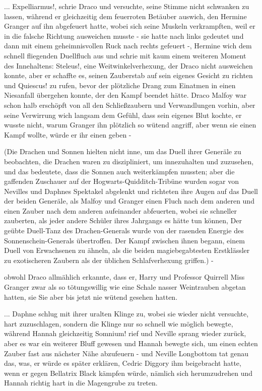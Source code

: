 ... \glqq{}Expelliarmus!\grqq{}, schrie Draco und versuchte, seine Stimme nicht
schwanken zu lassen, während er gleichzeitig dem feuerroten Betäuber auswich,
den Hermine Granger auf ihn abgefeuert hatte, wobei sich seine Muskeln
verkrampften, weil er in die falsche Richtung ausweichen musste - sie hatte nach
links gedeutet und dann mit einem geheimnisvollen Ruck nach rechts gefeuert -,
Hermine wich dem schnell fliegenden Duellfluch aus und schrie mit kaum einem
weiteren Moment des Innehaltens: \glqq{}Steleus!\grqq{}, eine
Weitwinkelverhexung, der Draco nicht ausweichen konnte, aber er schaffte es,
seinen Zauberstab auf sein eigenes Gesicht zu richten und \glqq{}Quiescus!\grqq{}
zu rufen, bevor der plötzliche Drang zum Einatmen in einen Niesanfall übergehen
konnte, der den Kampf beendet hätte. Draco Malfoy war schon halb erschöpft von
all den Schließzaubern und Verwandlungen vorhin, aber seine Verwirrung wich
langsam dem Gefühl, dass sein eigenes Blut kochte, er wusste nicht, warum
Granger ihn plötzlich so wütend angriff, aber wenn sie einen Kampf wollte, würde
er ihr einen geben -

(Die Drachen und Sonnen hielten nicht inne, um das Duell ihrer Generäle zu
beobachten, die Drachen waren zu diszipliniert, um innezuhalten und zuzusehen,
und das bedeutete, dass die Sonnen auch weiterkämpfen mussten; aber die
gaffenden Zuschauer auf der Hogwarts-Quidditch-Tribüne wurden sogar von Nevilles
und Daphnes Spektakel abgelenkt und richteten ihre Augen auf das Duell der
beiden Generäle, als Malfoy und Granger einen Fluch nach dem anderen und einen
Zauber nach dem anderen aufeinander abfeuerten, wobei sie schneller zauberten,
als jeder andere Schüler ihres Jahrgangs es hätte tun können, Der geübte
Duell-Tanz des Drachen-Generals wurde von der rasenden Energie des
Sonnenschein-Generals übertroffen. Der Kampf zwischen ihnen begann, einem Duell
von Erwachsenen zu ähneln, als die beiden magiebegabtesten Erstklässler zu
exotischeren Zaubern als der üblichen Schlafverhexung griffen.) -

obwohl Draco allmählich erkannte, dass er, Harry und Professor Quirrell Miss
Granger zwar als so tötungswillig wie eine Schale nasser Weintrauben abgetan
hatten, sie Sie aber bis jetzt nie wütend gesehen hatten.

... Daphne schlug mit ihrer uralten Klinge zu, wobei sie wieder nicht versuchte,
hart zuzuschlagen, sondern die Klinge nur so schnell wie möglich bewegte,
während Hannah gleichzeitig \glqq{}Somnium!\grqq{} rief und Neville sprang wieder
zurück, aber es war ein weiterer Bluff gewesen und Hannah bewegte sich, um einen
echten Zauber fast aus nächster Nähe abzufeuern - und Neville Longbottom tat
genau das, was, er würde es später erklären, Cedric Diggory ihm beigebracht
hatte, wenn er gegen Bellatrix Black kämpfen würde, nämlich sich herumzudrehen
und Hannah richtig hart in die Magengrube zu treten.

